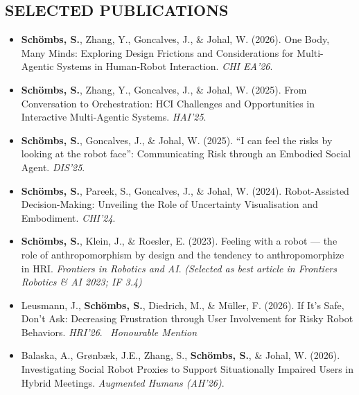 \documentclass[a4paper, 11pt]{article}
\begin{document}
{\smallskip

\subsection{SELECTED PUBLICATIONS}
\vspace{2pt}

\begin{itemize}[nosep]

  \item \textbf{Schömbs, S.}, Zhang, Y., Goncalves, J., \& Johal, W. (2026). One Body, Many Minds: Exploring Design Frictions and Considerations for Multi-Agentic Systems in Human-Robot Interaction. \textit{CHI EA'26}.

  \item \textbf{Schömbs, S.}, Zhang, Y., Goncalves, J., \& Johal, W. (2025). From Conversation to Orchestration: HCI Challenges and Opportunities in Interactive Multi-Agentic Systems. \textit{HAI'25}.

  \item \textbf{Schömbs, S.}, Goncalves, J., \& Johal, W. (2025). ``I can feel the risks by looking at the robot face'': Communicating Risk through an Embodied Social Agent. \textit{DIS'25}.

  \item \textbf{Schömbs, S.}, Pareek, S., Goncalves, J., \& Johal, W. (2024). Robot-Assisted Decision-Making: Unveiling the Role of Uncertainty Visualisation and Embodiment. \textit{CHI'24}.

  \item \textbf{Schömbs, S.}, Klein, J., \& Roesler, E. (2023). Feeling with a robot --- the role of anthropomorphism by design and the tendency to anthropomorphize in HRI. \textit{Frontiers in Robotics and AI}. \textit{(Selected as best article in Frontiers Robotics \& AI 2023; IF 3.4)}

  \item Leusmann, J., \textbf{Schömbs, S.}, Diedrich, M., \& Müller, F. (2026). If It's Safe, Don't Ask: Decreasing Frustration through User Involvement for Risky Robot Behaviors. \textit{HRI'26}. \faMedal~\textit{Honourable Mention}

  \item Balaska, A., Grønbæk, J.E., Zhang, S., \textbf{Schömbs, S.}, \& Johal, W. (2026). Investigating Social Robot Proxies to Support Situationally Impaired Users in Hybrid Meetings. \textit{Augmented Humans (AH'26)}.

\end{itemize}

}
\end{document}
